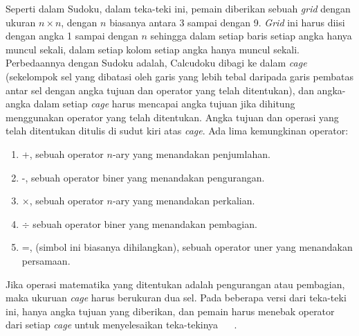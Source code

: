Seperti dalam Sudoku, dalam teka-teki ini, pemain diberikan sebuah \textit{grid} dengan ukuran \begin{math}n \times n\end{math}, dengan \begin{math}n\end{math} biasanya antara 3 sampai dengan 9. \textit{Grid} ini harus diisi dengan angka 1 sampai dengan \begin{math}n\end{math} sehingga dalam setiap baris setiap angka hanya muncul sekali, dalam setiap kolom setiap angka hanya muncul sekali. Perbedaannya dengan Sudoku adalah, Calcudoku dibagi ke dalam \textit{cage} (sekelompok sel yang dibatasi oleh garis yang lebih tebal daripada garis pembatas antar sel dengan angka tujuan dan operator yang telah ditentukan), dan angka-angka dalam setiap \textit{cage}  harus mencapai angka tujuan jika dihitung menggunakan operator yang telah ditentukan. Angka tujuan dan operasi yang telah ditentukan ditulis di sudut kiri atas \textit{cage}. Ada lima kemungkinan operator:
\begin{enumerate}
\item +, sebuah operator \begin{math}n\end{math}-ary yang menandakan penjumlahan.
\item -, sebuah operator biner yang menandakan pengurangan.
\item \begin{math}\times\end{math}, sebuah operator  \begin{math}n\end{math}-ary yang menandakan perkalian.
\item \begin{math}\div\end{math} sebuah operator biner yang menandakan pembagian.
\item =, (simbol ini biasanya dihilangkan), sebuah operator uner yang menandakan persamaan.
\end{enumerate}
Jika operasi matematika yang ditentukan adalah pengurangan atau pembagian, maka ukuruan \textit{cage} harus berukuran dua sel. Pada beberapa versi dari teka-teki ini, hanya angka tujuan yang diberikan, dan pemain harus menebak operator dari setiap \textit{cage} untuk menyelesaikan teka-tekinya ~\cite{fahda:16:backtracking} ~\cite{johanna:12:hybrid}.

